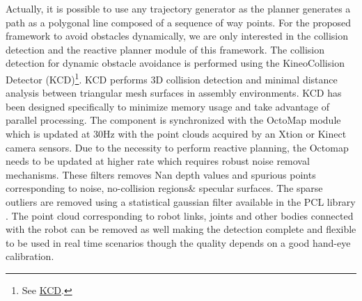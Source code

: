 Actually, it is possible to use any trajectory generator as the planner generates a path as a polygonal line composed of a sequence of way points. For the proposed framework to avoid obstacles dynamically, we are only interested in the collision detection and the reactive planner module of this framework. The collision detection for dynamic obstacle avoidance is performed using the Kineo\texttrademark Collision Detector (KCD)\footnote{See \href{http://www.plm.automation.siemens.com/en\_us/products/open/kineo/collision-detector/index.shtml}{KCD}.}. KCD performs 3D collision detection and minimal distance analysis between triangular mesh surfaces in assembly environments. KCD has been designed specifically to minimize memory usage and take advantage of parallel processing. The component is synchronized with the OctoMap module which is updated at 30Hz with the point clouds acquired by an Xtion or Kinect camera sensors. Due to the necessity to perform reactive planning, the Octomap needs to be updated at higher rate which requires robust noise removal mechanisms. These filters removes Nan depth values and spurious points corresponding to noise, no-collision regions\& specular surfaces. The sparse outliers are removed using a statistical gaussian filter available in the PCL library \cite{rusu20113d}. The point cloud corresponding to robot links, joints and other bodies connected with the robot can be removed as well making the detection complete and flexible to be used in real time scenarios though the quality depends on a good hand-eye calibration.

